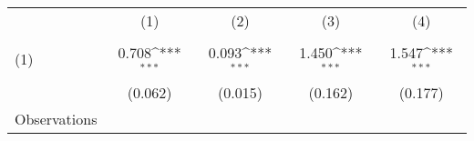 {
\def\sym#1{\ifmmode^{#1}\else\(^{#1}\)\fi}
\begin{tabular}{l*{4}{c}}
\hline\hline
                    &\multicolumn{1}{c}{(1)}&\multicolumn{1}{c}{(2)}&\multicolumn{1}{c}{(3)}&\multicolumn{1}{c}{(4)}\\
                    &\multicolumn{1}{c}{} &\multicolumn{1}{c}{} &\multicolumn{1}{c}{} &\multicolumn{1}{c}{} \\
\hline
(1)                 &       0.708\sym{***}&       0.093\sym{***}&       1.450\sym{***}&       1.547\sym{***}\\
                    &     (0.062)         &     (0.015)         &     (0.162)         &     (0.177)         \\
\hline
Observations        &                     &                     &                     &                     \\
\hline\hline
\end{tabular}
}
